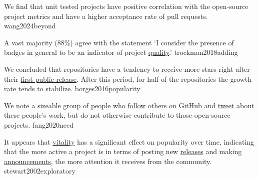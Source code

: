 \documentclass{article}
\begin{document}
  {We find that unit tested projects have positive correlation with the open-source project metrics and have a higher acceptance rate of pull requests.}
  {wang2024beyond}



  {A vast majority (88\%) agree with the statement `I consider the presence of badges in general to be an indicator of project \ul{quality}.'}
  {trockman2018adding}


  {We concluded that repositories have a tendency to receive more stars right after their \ul{first public release}. After this period, for half of the repositories the growth rate tends to stabilize.}
  {borges2016popularity}

  {We note a sizeable group of people who \ul{follow} others on GitHub and \ul{tweet} about these people’s work, but do not otherwise contribute to those open-source projects.}
  {fang2020need}


  {It appears that \ul{vitality} has a significant effect on popularity over time, indicating that the more active a project is in terms of posting new \ul{releases} and making \ul{announcements}, the more attention it receives from the community.}
  {stewart2002exploratory}


\end{document}
